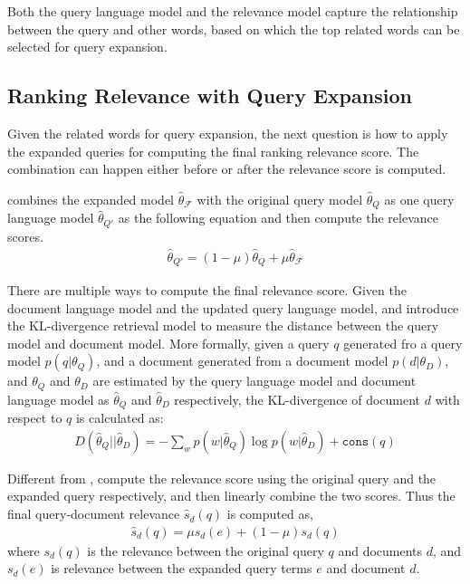 Both the query language model and the relevance model capture the relationship between the query and other words, based on which the top related words can be selected for query expansion. 

\subsection{Ranking Relevance with Query Expansion}

Given the related words for query expansion, the next question is how to apply the expanded queries for computing the final ranking relevance score. The combination can happen either before or after the relevance score is computed.

\cite{zhai-01b} combines the expanded model $\hat{\theta}_{\mathcal{F}}$ with the original query model $\hat{\theta}_{Q}$ as one query language model $\hat{\theta}_{Q'} $ as the following equation and then compute the relevance scores. 
\begin{align}
\hat{\theta}_{Q'} = (1 - \mu)\hat{\theta}_{Q} + \mu \hat{\theta}_{\mathcal{F}}
\end{align}

There are multiple ways to compute the final relevance score. Given the document language model and the updated query language model,  \cite{Lafferty-2001} and \cite{zhai-01b} introduce the KL-divergence retrieval model to measure the distance between the query model and document model. More formally, given a query $q$ generated fro a query model $p(q|\theta_Q)$, and a document generated from a document model $p(d|\theta_D)$, and $\theta_Q$ and $\theta_D$ are estimated by the query language model and document language model as $\hat{\theta}_Q$ and $\hat{\theta}_D$ respectively, the KL-divergence of document $d$ with respect to $q$ is calculated as:
\begin{align}
D(\hat{\theta}_Q || \hat{\theta}_D) = -\sum_w p(w|\hat{\theta}_Q) \log p(w | \hat{\theta}_D) + \texttt{cons}(q)
\end{align}

Different from \cite{zhai-01b}, \cite{Lavrenko-2001} compute the relevance score using the original query and the expanded query respectively, and then linearly combine the two scores. Thus the final query-document relevance $\hat{s}_d(q)$ is computed as,
\begin{align}
\label{eq:rm_qe_comb}
\hat{s}_d(q) = \mu s_d(e) + (1-\mu)s_d(q) 
\end{align}
where $s_d(q)$ is the relevance between the original query $q$ and documents $d$, and $s_d(e)$ is relevance between the expanded query terms $e$ and document $d$. 

